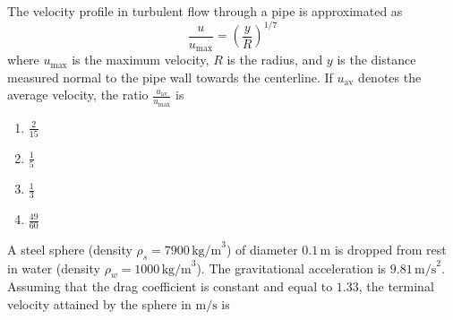  \iffalse
    \title{Assignment}
    \author{EE24BTECH11035}
    \section{xe}
    \chapter{2015}
  \fi
  \item The velocity profile in turbulent flow through a pipe is approximated as
    \begin{equation*}
    \frac{u}{u_{\text{max}}} = \left(\frac{y}{R}\right)^{1/7}
    \end{equation*}
    where $u_{\text{max}}$ is the maximum velocity, $R$ is the radius, and $y$ is the distance measured normal to the pipe wall towards the centerline. If $u_{\text{av}}$ denotes the average velocity, the ratio $\frac{u_{\text{av}}}{u_{\text{max}}}$ is
    \begin{enumerate}
        \item $\frac{2}{15}$\\
        \item $\frac{1}{5}$\\
        \item $\frac{1}{3}$\\
        \item $\frac{49}{60}$
    \end{enumerate}

\item A steel sphere (density $\rho_s = 7900 \, \text{kg/m}^3$) of diameter $0.1 \, \text{m}$ is dropped from rest in water (density $\rho_w = 1000 \, \text{kg/m}^3$). The gravitational acceleration is $9.81 \, \text{m/s}^2$. Assuming that the drag coefficient is constant and equal to $1.33$, the terminal velocity attained by the sphere in $\text{m/s}$ is \underline{\hspace{2cm}}
    
